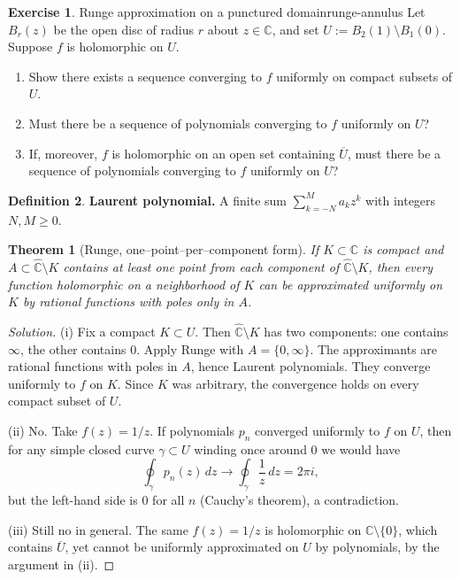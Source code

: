 \documentclass[11pt,a4paper]{article}
\newtheorem{theorem}{Theorem}
\theoremstyle{definition}
\newtheorem{exercise}{Exercise} %
\theoremstyle{definition}
\newtheorem{definition}[exercise]{Definition}
\theoremstyle{plain}
\theoremstyle{remark}
\begin{document}

\begin{exercise}{Runge approximation on a punctured domain}{runge-annulus}
	Let $B_r(z)$ be the open disc of radius $r$ about $z\in\mathbb C$, and set
	$U:=B_2(1)\setminus B_1(0)$. Suppose $f$ is holomorphic on $U$.
	\begin{enumerate}
		\item[(i)] Show there exists a sequence converging to $f$ uniformly on compact subsets of $U$.
		\item[(ii)] Must there be a sequence of polynomials converging to $f$ uniformly on $U$?
		\item[(iii)] If, moreover, $f$ is holomorphic on an open set containing $\overline U$, must there be a sequence
		of polynomials converging to $f$ uniformly on $U$?
	\end{enumerate}
\end{exercise}

\begin{definition}
	\textbf{Laurent polynomial.} A finite sum $\sum_{k=-N}^{M} a_k z^k$ with integers $N,M\ge0$.
\end{definition}

\begin{theorem}[Runge, one–point–per–component form]
	If $K\subset\mathbb C$ is compact and $A\subset\widehat{\mathbb C}\setminus K$ contains at least one point from each
	component of $\widehat{\mathbb C}\setminus K$, then every function holomorphic on a neighborhood of $K$
	can be approximated uniformly on $K$ by rational functions with poles only in $A$.
\end{theorem}

\begin{proof}[Solution]
	(i) Fix a compact $K\subset U$. Then $\widehat{\mathbb C}\setminus K$ has two components: one contains $\infty$,
	the other contains $0$. Apply Runge with $A=\{0,\infty\}$. The approximants are rational functions with poles in $A$,
	hence Laurent polynomials. They converge uniformly to $f$ on $K$. Since $K$ was arbitrary, the convergence holds on every compact subset of $U$.
	
	(ii) No. Take $f(z)=1/z$. If polynomials $p_n$ converged uniformly to $f$ on $U$, then for any simple closed curve
	$\gamma\subset U$ winding once around $0$ we would have
	\[
	\oint_\gamma p_n(z)\,dz \to \oint_\gamma \frac{1}{z}\,dz=2\pi i,
	\]
	but the left-hand side is $0$ for all $n$ (Cauchy’s theorem), a contradiction.
	
	(iii) Still no in general. The same $f(z)=1/z$ is holomorphic on $\mathbb C\setminus\{0\}$, which contains $\overline U$,
	yet cannot be uniformly approximated on $U$ by polynomials, by the argument in (ii).
\end{proof}
\end{document}
